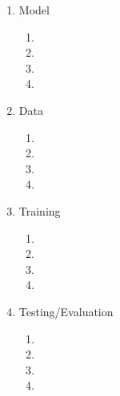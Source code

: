 \documentclass[12pt,letterpaper]{article}
\theoremstyle{remark}
\theoremstyle{plain}
\begin{document}

\begin{enumerate}
\item[] Model
\begin{enumerate}
\item[] 
\item[] 
\item[] 
\item[] 
\end{enumerate}
\item[] Data
\begin{enumerate}
\item[] 
\item[] 
\item[] 
\item[] 
\end{enumerate}
\item[] Training
\begin{enumerate}
\item[] 
\item[] 
\item[] 
\item[] 
\end{enumerate}
\item[] Testing/Evaluation
\begin{enumerate}
\item[] 
\item[] 
\item[] 
\item[] 
\end{enumerate}
\end{enumerate}
\end{document}
